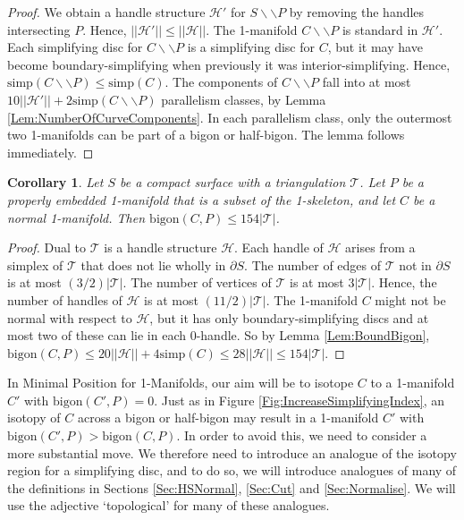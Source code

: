 \documentclass[oneside]{amsart}
\numberwithin{equation}{section}
\theoremstyle{plain}
\newtheorem{corollary}[equation]{Corollary}
\theoremstyle{definition}
\newcommand{\calT}{{\mathcal{T}}}
\newcommand{\cut}{\backslash\backslash}
\newcommand{\calH}{\mathcal{H}}
\begin{document}
\begin{proof}
We obtain a handle structure $\calH'$ for $S \cut P$ by removing the handles intersecting $P$. Hence, $||\calH'|| \leq ||\calH||$. The 1-manifold $C \cut P$ is standard in $\calH'$. Each simplifying disc for $C \cut P$ is a simplifying disc for $C$, but it may have become boundary-simplifying when previously it was interior-simplifying. Hence, $\mathrm{simp}(C \cut P) \leq \mathrm{simp}(C)$. The components of $C \cut P$ fall into at most $10 ||\calH'|| + 2 \mathrm{simp}(C \cut P)$ parallelism classes, by Lemma \ref{Lem:NumberOfCurveComponents}. In each parallelism class, only the outermost two 1-manifolds can be part of a bigon or half-bigon. The lemma follows immediately.
\end{proof}


\begin{corollary} 
Let $S$ be a compact surface with a triangulation $\calT$. Let $P$ be a properly embedded 1-manifold that is a subset of the 1-skeleton, and let $C$ be a normal 1-manifold. Then $\mathrm{bigon}(C,P) \leq  154 |\calT|$.
\end{corollary}

\begin{proof} Dual to $\calT$ is a handle structure $\calH$. Each handle of $\calH$ arises from a simplex of $\calT$ that does not lie wholly in $\partial S$. The number of edges of $\calT$ not in $\partial S$ is at most $(3/2)|\calT|$. The number of vertices of $\calT$ is at most $3|\calT|$. Hence, the number of handles of $\calH$ is at most $(11/2)|\calT|$. The 1-manifold $C$ might not be normal with respect to $\calH$, but it has only boundary-simplifying discs and at most two of these can lie in each 0-handle. So by Lemma \ref{Lem:BoundBigon}, $\mathrm{bigon}(C,P) \leq 20 ||\calH|| + 4 \mathrm{simp}(C) \leq 28 ||\calH|| \leq 154 |\calT|$.
\end{proof}


In {\sc Minimal Position for 1-Manifolds}, our aim will be to isotope $C$ to a 1-manifold $C'$ with $\mathrm{bigon}(C',P) = 0$. Just as in Figure \ref{Fig:IncreaseSimplifyingIndex}, an isotopy of $C$ across a bigon or half-bigon may result in a 1-manifold $C'$ with $\mathrm{bigon}(C',P) > \mathrm{bigon}(C,P)$. In order to avoid this, we need to consider a more substantial move. We therefore need to introduce an analogue of the isotopy region for a simplifying disc, and to do so, we will introduce analogues of many of the definitions in Sections \ref{Sec:HSNormal}, \ref{Sec:Cut} and \ref{Sec:Normalise}. We will use the adjective `topological' for many of these analogues.
\end{document}
